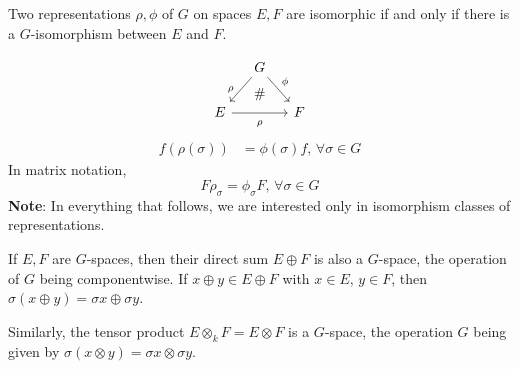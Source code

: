 \documentclass{article}
\begin{document}
\begin{defi}
    Two representations $\rho,\phi$ of $G$ on spaces $E,F$ are
    isomorphic if and only if  there is a $G$-isomorphism between $E$
    and $F$.
\end{defi}
\begin{equation} \begin{tikzcd}[column sep=small]
    & G\ar[dl,"\rho" left=3]\ar[dr,"\phi"] &  \, \\
        E \ar[rr,"\rho" below=3] &
            \ar[u,phantom, "\#"] 
                & F
\end{tikzcd} \end{equation}
\begin{align}
    f(\rho(\sigma)) &= \phi(\sigma) f, \, \forall \sigma\in G
\end{align}
In matrix notation, 
\begin{equation}
    F \rho_\sigma = \phi_\sigma F,\, \forall\sigma\in G
\end{equation}
\textbf{Note}: In everything that follows, we are interested only in
isomorphism classes of representations.

If $E,F$ are $G$-spaces, then their direct sum $E\oplus F$ is also a
$G$-space, the operation of $G$ being componentwise. If $x\oplus y\in
E\oplus F$ with $x\in E,\,y\in F$, then $\sigma(x\oplus y)=\sigma
x\oplus \sigma y$.

Similarly, the tensor product $E\otimes_k F=E\otimes F$ is a
$G$-space, the operation $G$ being given by $\sigma(x\otimes y)=\sigma
x\otimes \sigma y$.
\end{document}
